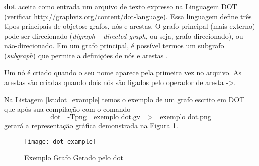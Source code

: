 \textbf{dot} aceita como entrada um arquivo de texto expresso na Linguagem
DOT (verificar \url{http://graphviz.org/content/dot-language}). Essa
linguagem define três tipos principais de objetos: grafos, nós e arestas.
O grafo principal (mais externo) pode ser direcionado (\emph{digraph} {--}
\emph{directed graph}, ou seja, grafo direcionado), ou não-direcionado. Em um
grafo principal, é possível termos um subgrafo (\emph{subgraph}) que permite
a definições de nós e arestas \cite{gansner09}.

Um nó é criado quando o seu nome aparece pela primeira vez no arquivo. As
arestas são criadas quando dois nós são ligados pelo operador de aresta {->}.

Na Listagem \ref{lst:dot_example} temos o exemplo de um grafo escrito em
DOT que após sua compilação com o comando
$$
\text{dot} \quad \text{-Tpng} \quad \text{exemplo\_dot.gv} \quad \text{>}
\quad \text{exemplo\_dot.png}
$$
gerará a representação gráfica demonstrada na Figura \ref{fig:dot_example}.



\begin{figure}
	\begin{center}
		\texttt{[image: dot\_example]}
	\end{center}
	\caption{Exemplo Grafo Gerado pelo dot}
	\label{fig:dot_example}
\end{figure}
